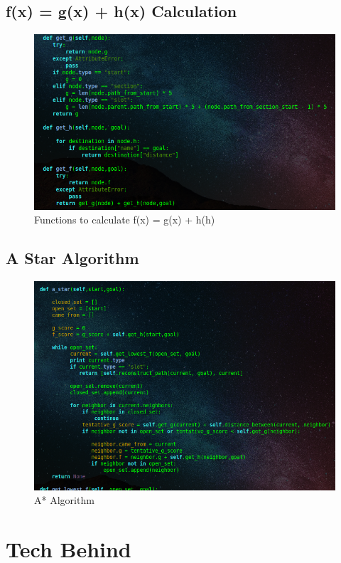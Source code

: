 \subsection{f(x) = g(x) + h(x) Calculation}
\begin{figure}[H]
    \centering
    \includegraphics[width=1\textwidth]{images/f_g_h.png}
    \caption{Functions to calculate f(x) = g(x) + h(h)}
    \label{fig:f_g_h}
\end{figure}

\subsection{A Star Algorithm}
\begin{figure}[H]
    \centering
    \includegraphics[width=1\textwidth]{images/a_star.png}
    \caption{A* Algorithm}
    \label{fig:a_star}
\end{figure}

\section{Tech Behind}
